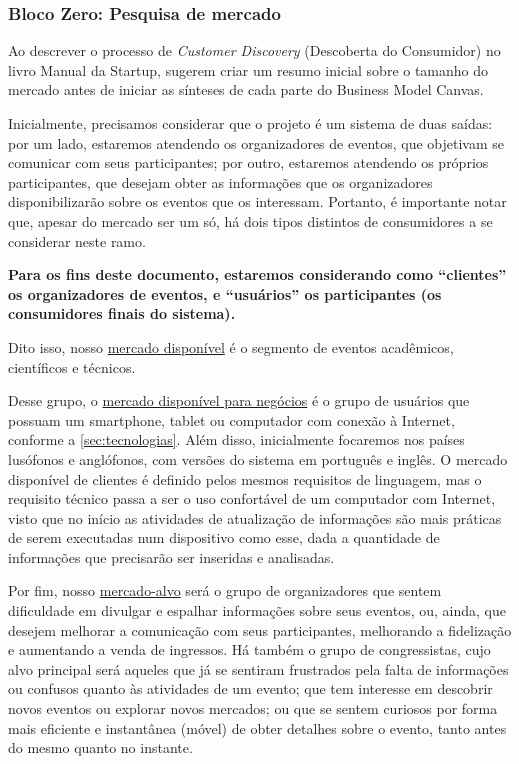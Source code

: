 \documentclass[12pt,a4paper,twoside,hyphens,english,brazil]{abntex2}
\begin{document}
\subsubsection*{Bloco Zero: Pesquisa de mercado}
\label{sec:lean:mercado}
Ao descrever o processo de \textit{Customer Discovery} (Descoberta do Consumidor) no livro Manual da Startup\cite{manual-startup},  sugerem criar um resumo inicial sobre o tamanho do mercado antes de iniciar as sínteses de cada parte do Business Model Canvas.

Inicialmente, precisamos considerar que o projeto é um sistema de duas saídas: por um lado, estaremos atendendo os organizadores de eventos, que objetivam se comunicar com seus participantes; por outro, estaremos atendendo os próprios participantes, que desejam obter as informações que os organizadores disponibilizarão sobre os eventos que os interessam. Portanto, é importante notar que, apesar do mercado ser um só, há dois tipos distintos de consumidores a se considerar neste ramo.

\textbf{Para os fins deste documento, estaremos considerando como ``clientes'' os organizadores de eventos, e ``usuários'' os participantes (os consumidores finais do sistema).}

Dito isso, nosso \underline{mercado disponível} é o segmento de eventos acadêmicos, científicos e técnicos.

Desse grupo, o \underline{mercado disponível para negócios} é o grupo de usuários que possuam um smartphone, tablet ou computador com conexão à Internet, conforme a \autoref{sec:tecnologias}. Além disso, inicialmente focaremos nos países lusófonos e anglófonos, com versões do sistema em português e inglês. O mercado disponível de clientes é definido pelos mesmos requisitos de linguagem, mas o requisito técnico passa a ser o uso confortável de um computador com Internet, visto que no início as atividades de atualização de informações são mais práticas de serem executadas num dispositivo como esse, dada a quantidade de informações que precisarão ser inseridas e analisadas.

Por fim, nosso \underline{mercado-alvo} será o grupo de organizadores que sentem dificuldade em divulgar e espalhar informações sobre seus eventos, ou, ainda, que desejem melhorar a comunicação com seus participantes, melhorando a fidelização e aumentando a venda de ingressos. Há também o grupo de congressistas, cujo alvo principal será aqueles que já se sentiram frustrados pela falta de informações ou confusos quanto às atividades de um evento; que tem interesse em descobrir novos eventos ou explorar novos mercados; ou que se sentem curiosos por forma mais eficiente e instantânea (móvel) de obter detalhes sobre o evento, tanto antes do mesmo quanto no instante.
\end{document}
